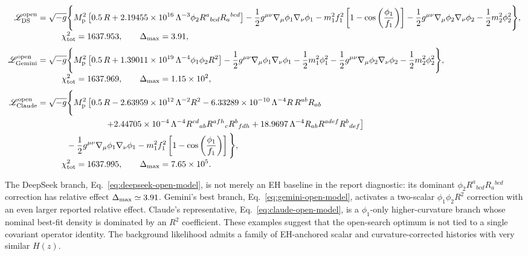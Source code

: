 \documentclass[aps,prd,twocolumn,superscriptaddress,nofootinbib,longbibliography]{revtex4-2}
\newcommand{\Mp}{M_{\rm p}}
\newcommand{\Lam}{\Lambda}
\newcommand{\chiT}{\chi^2_{\rm tot}}
\begin{document}
\begin{widetext}
\begingroup\small
\begin{align}
\mathscr{L}^{\rm open}_{\rm DS}
&=\sqrt{-g}\Bigg\{
\Mp^2\left[
0.5\,R
+2.19455\times10^{16}\,\Lam^{-3}\phi_2
R^a{}_{bcd}R_a{}^{bcd}
\right]
-\frac12 g^{\mu\nu}\nabla_\mu\phi_1\nabla_\nu\phi_1
-m_1^2f_1^2\left[1-\cos\left(\frac{\phi_1}{f_1}\right)\right]
-\frac12 g^{\mu\nu}\nabla_\mu\phi_2\nabla_\nu\phi_2
-\frac12 m_2^2\phi_2^2
\Bigg\},
\nonumber\\[-1mm]
&\hspace{1cm}
\chiT=1637.953,
\qquad
\Delta_{\rm max}=3.91 ,
\label{eq:deepseek-open-model}
\\[1mm]
\mathscr{L}^{\rm open}_{\rm Gemini}
&=\sqrt{-g}\Bigg\{
\Mp^2\left[
0.5\,R
+1.39011\times10^{19}\,\Lam^{-4}\phi_1\phi_2 R^2
\right]
-\frac12 g^{\mu\nu}\nabla_\mu\phi_1\nabla_\nu\phi_1
-\frac12 m_1^2\phi_1^2
-\frac12 g^{\mu\nu}\nabla_\mu\phi_2\nabla_\nu\phi_2
-\frac12 m_2^2\phi_2^2
\Bigg\},
\nonumber\\[-1mm]
&\hspace{1cm}
\chiT=1637.969,
\qquad
\Delta_{\rm max}=1.15\times10^{2} ,
\label{eq:gemini-open-model}
\\[1mm]
\mathscr{L}^{\rm open}_{\rm Claude}
&=\sqrt{-g}\Bigg\{
\Mp^2\left[
0.5\,R
-2.63959\times10^{12}\,\Lam^{-2}R^2
-6.33289\times10^{-10}\,\Lam^{-4}R\,R^{ab}R_{ab}
\right.\nonumber\\
&\hspace{2.8cm}\left.
+2.44705\times10^{-4}\,\Lam^{-4}
R^{cd}{}_{ab}R^{afh}{}_{c}R^{b}{}_{fdh}
+18.9697\,\Lam^{-4}R_{ab}R^{adef}R^{b}{}_{def}
\right]\nonumber\\
&\hspace{1.2cm}
-\frac12 g^{\mu\nu}\nabla_\mu\phi_1\nabla_\nu\phi_1
-m_1^2f_1^2\left[1-\cos\left(\frac{\phi_1}{f_1}\right)\right]
\Bigg\},
\nonumber\\[-1mm]
&\hspace{1cm}
\chiT=1637.995,
\qquad
\Delta_{\rm max}=7.65\times10^{5}.
\label{eq:claude-open-model}
\end{align}
\endgroup
\end{widetext}

The DeepSeek branch, Eq.~\eqref{eq:deepseek-open-model}, is not merely an EH baseline in the report diagnostic: its dominant $\phi_2R^a{}_{bcd}R_a{}^{bcd}$ correction has relative effect $\Delta_{\rm max}\simeq3.91$.  Gemini's best branch, Eq.~\eqref{eq:gemini-open-model}, activates a two-scalar $\phi_1\phi_2R^2$ correction with an even larger reported relative effect.  Claude's representative, Eq.~\eqref{eq:claude-open-model}, is a $\phi_1$-only higher-curvature branch whose nominal best-fit density is dominated by an $R^2$ coefficient.  These examples suggest that the open-search optimum is not tied to a single covariant operator identity.  The background likelihood admits a family of EH-anchored scalar and curvature-corrected histories with very similar $H(z)$.
\end{document}
